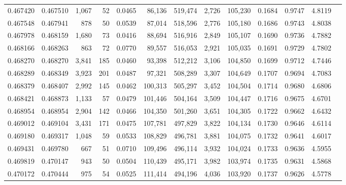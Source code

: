 \begin{tabular}{rrrrrrrrrrrrr}
0.467420 & 0.467510 & 1,067 &    52 &                                     0.0465 &  86,136 & 519,474 &   2,726 & 105,230 & 0.1684 & 0.9747 & 4.8119 \\
0.467548 & 0.467941 &   878 &    50 &                                     0.0539 &  87,014 & 518,596 &   2,776 & 105,180 & 0.1686 & 0.9743 & 4.8038 \\
0.467978 & 0.468159 & 1,680 &    73 &                                     0.0416 &  88,694 & 516,916 &   2,849 & 105,107 & 0.1690 & 0.9736 & 4.7882 \\
0.468166 & 0.468263 &   863 &    72 &                                     0.0770 &  89,557 & 516,053 &   2,921 & 105,035 & 0.1691 & 0.9729 & 4.7802 \\
0.468270 & 0.468270 & 3,841 &   185 &                                     0.0460 &  93,398 & 512,212 &   3,106 & 104,850 & 0.1699 & 0.9712 & 4.7446 \\
0.468289 & 0.468349 & 3,923 &   201 &                                     0.0487 &  97,321 & 508,289 &   3,307 & 104,649 & 0.1707 & 0.9694 & 4.7083 \\
0.468379 & 0.468407 & 2,992 &   145 &                                     0.0462 & 100,313 & 505,297 &   3,452 & 104,504 & 0.1714 & 0.9680 & 4.6806 \\
0.468421 & 0.468873 & 1,133 &    57 &                                     0.0479 & 101,446 & 504,164 &   3,509 & 104,447 & 0.1716 & 0.9675 & 4.6701 \\
0.468954 & 0.468954 & 2,904 &   142 &                                     0.0466 & 104,350 & 501,260 &   3,651 & 104,305 & 0.1722 & 0.9662 & 4.6432 \\
0.469012 & 0.469104 & 3,431 &   171 &                                     0.0475 & 107,781 & 497,829 &   3,822 & 104,134 & 0.1730 & 0.9646 & 4.6114 \\
0.469180 & 0.469317 & 1,048 &    59 &                                     0.0533 & 108,829 & 496,781 &   3,881 & 104,075 & 0.1732 & 0.9641 & 4.6017 \\
0.469431 & 0.469780 &   667 &    51 &                                     0.0710 & 109,496 & 496,114 &   3,932 & 104,024 & 0.1733 & 0.9636 & 4.5955 \\
0.469819 & 0.470147 &   943 &    50 &                                     0.0504 & 110,439 & 495,171 &   3,982 & 103,974 & 0.1735 & 0.9631 & 4.5868 \\
0.470172 & 0.470444 &   975 &    54 &                                     0.0525 & 111,414 & 494,196 &   4,036 & 103,920 & 0.1737 & 0.9626 & 4.5778 \\

\end{tabular}
